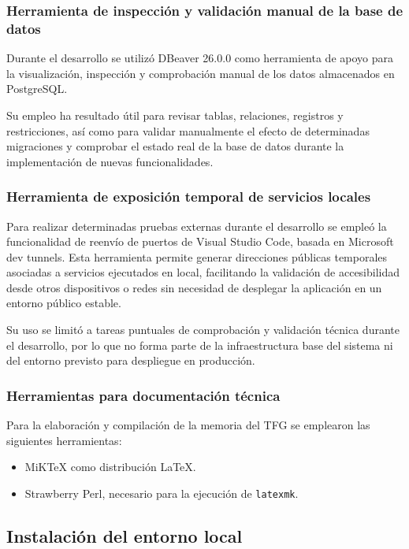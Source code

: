 \subsubsection*{Herramienta de inspección y validación manual de la base de datos}

Durante el desarrollo se utilizó DBeaver 26.0.0 como herramienta de apoyo para la visualización, inspección y comprobación manual de los datos almacenados en PostgreSQL.

Su empleo ha resultado útil para revisar tablas, relaciones, registros y restricciones, así como para validar manualmente el efecto de determinadas migraciones y comprobar el estado real de la base de datos durante la implementación de nuevas funcionalidades.

\subsubsection*{Herramienta de exposición temporal de servicios locales}

Para realizar determinadas pruebas externas durante el desarrollo se empleó la funcionalidad de reenvío de puertos de Visual Studio Code, basada en Microsoft dev tunnels. Esta herramienta permite generar direcciones públicas temporales asociadas a servicios ejecutados en local, facilitando la validación de accesibilidad desde otros dispositivos o redes sin necesidad de desplegar la aplicación en un entorno público estable.

Su uso se limitó a tareas puntuales de comprobación y validación técnica durante el desarrollo, por lo que no forma parte de la infraestructura base del sistema ni del entorno previsto para despliegue en producción.

\subsubsection*{Herramientas para documentación técnica}

Para la elaboración y compilación de la memoria del TFG se emplearon las siguientes herramientas:

\begin{itemize}
    \item MiKTeX como distribución \LaTeX.
    \item Strawberry Perl, necesario para la ejecución de \texttt{latexmk}.
\end{itemize}

\subsection{Instalación del entorno local}

